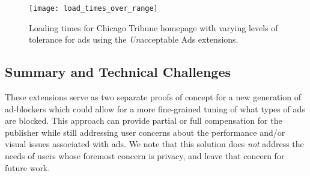\begin{figure}[t]
\centering
\texttt{[image: load\_times\_over\_range]}
\caption{Loading times for Chicago Tribune homepage with varying levels of tolerance for ads using the \textit{Un}acceptable Ads extensions.}
\label{fig:load_times_over_range}
\end{figure}

\subsection{Summary and Technical Challenges}
These extensions serve as two separate proofs of concept for a new generation of ad-blockers which could allow for a more fine-grained tuning of what types of ads are blocked.
This approach can provide partial or full compensation for the publisher while still addressing user concerns about the performance and/or visual issues associated with ads.
We note that this solution does \textit{not} address the needs of users whose foremost concern is privacy, and leave that concern for future work.

